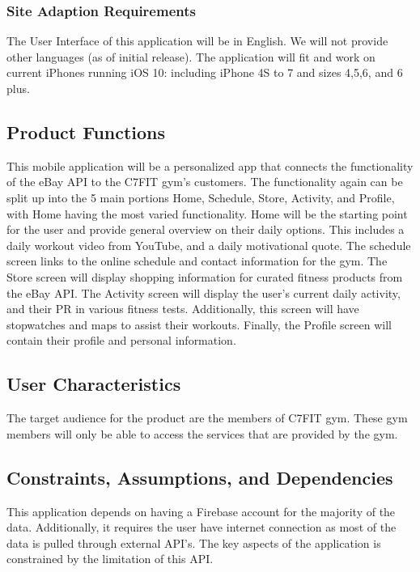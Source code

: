 \documentclass[letterpaper,10pt,titlepage]{article}
\begin{document}
\subsubsection{Site Adaption Requirements}

The User Interface of this application will be in English. We will not provide other languages (as of initial release). The application will fit and work on current iPhones running iOS 10: including iPhone 4S to 7 and sizes 4,5,6, and 6 plus.

\subsection{Product Functions}

This mobile application will be a personalized app that connects the functionality of the eBay API to the C7FIT gym’s customers. The functionality again can be split up into the 5 main portions Home, Schedule, Store, Activity, and Profile, with Home having the most varied functionality. Home will be the starting point for the user and provide general overview on their daily options. This includes a daily workout video from YouTube, and a daily motivational quote. The schedule screen links to the online schedule and contact information for the gym. The Store screen will display shopping information for curated fitness products from the eBay API. The Activity screen will display the user’s current daily activity, and their PR in various fitness tests. Additionally, this screen will have stopwatches and maps to assist their workouts. Finally, the Profile screen will contain their profile and personal information.

\subsection{User Characteristics}

The target audience for the product are the members of C7FIT gym. These gym members will only be able to access the services that are provided by the gym.

\subsection{Constraints, Assumptions, and Dependencies}

This application depends on having a Firebase account for the majority of the data. Additionally, it requires the user have internet connection as most of the data is pulled through external API’s. The key aspects of the application is constrained by the limitation of this API.\\
\end{document}
